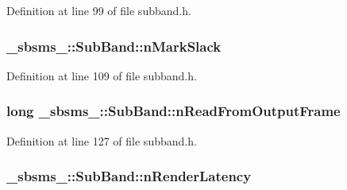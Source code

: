 Definition at line 99 of file subband.\+h.

\subsubsection[{\texorpdfstring{n\+Mark\+Slack}{nMarkSlack}}]{ \+\_\+sbsms\+\_\+\+::\+Sub\+Band\+::n\+Mark\+Slack\hspace{0.3cm}{\ttfamily [protected]}}\hypertarget{class__sbsms___1_1_sub_band_ae80c41544f0f5eec5af0db4b98fd57e1}{}\label{class__sbsms___1_1_sub_band_ae80c41544f0f5eec5af0db4b98fd57e1}


Definition at line 109 of file subband.\+h.

\subsubsection[{\texorpdfstring{n\+Read\+From\+Output\+Frame}{nReadFromOutputFrame}}]{\setlength{\rightskip}{0pt plus 5cm}long \+\_\+sbsms\+\_\+\+::\+Sub\+Band\+::n\+Read\+From\+Output\+Frame\hspace{0.3cm}{\ttfamily [protected]}}\hypertarget{class__sbsms___1_1_sub_band_a6e22bf535e2cd08424463ab47340ac24}{}\label{class__sbsms___1_1_sub_band_a6e22bf535e2cd08424463ab47340ac24}


Definition at line 127 of file subband.\+h.

\subsubsection[{\texorpdfstring{n\+Render\+Latency}{nRenderLatency}}]{ \+\_\+sbsms\+\_\+\+::\+Sub\+Band\+::n\+Render\+Latency\hspace{0.3cm}{\ttfamily [protected]}}\hypertarget{class__sbsms___1_1_sub_band_a4ff511a6d2cf6129253101fb61abea81}{}\label{class__sbsms___1_1_sub_band_a4ff511a6d2cf6129253101fb61abea81}


